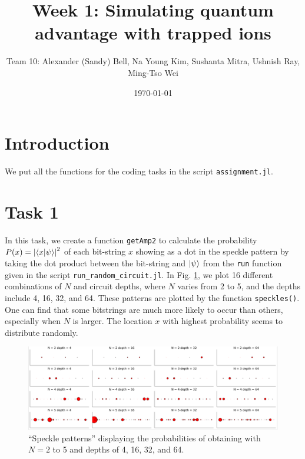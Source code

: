 \documentclass[12pt]{article}
\title{Week 1: Simulating quantum advantage with trapped ions}
\author{Team 10: Alexander (Sandy) Bell, Na Young Kim, Sushanta Mitra, Ushnish Ray, Ming-Tso Wei}
\date{\today}
\begin{document}
\maketitle



\section*{Introduction}

We put all the functions for the coding tasks in the script \texttt{assignment.jl}.



\section*{Task 1}

In this task, we create a function \texttt{getAmp2} to calculate the probability $P(x)= \abs{\ip{x}{\psi}}^2$ of each bit-string $x$ showing as a dot in the speckle pattern by taking the dot product between the bit-string and $\ket{\psi}$ from the \texttt{run} function given in the script \texttt{run\_random\_circuit.jl}. In Fig. \ref{fig:speckle}, we plot 16 different combinations of $N$ and circuit depths, where $N$ varies from 2 to 5, and the depths include 4, 16, 32, and 64. These patterns are plotted by the function \texttt{speckles()}. One can find that some bitstrings are much more likely to occur than others, especially when $N$ is larger. The location $x$ with highest probability seems to distribute randomly.

\begin{figure}
	\centering
	\includegraphics [width=\linewidth] {figures/Task_1a}
	\caption{
		``Speckle patterns'' displaying the probabilities of obtaining with $N=2$ to 5 and depths of 4, 16, 32, and 64.
	}
	\label{fig:speckle}
\end{figure}
\end{document}
